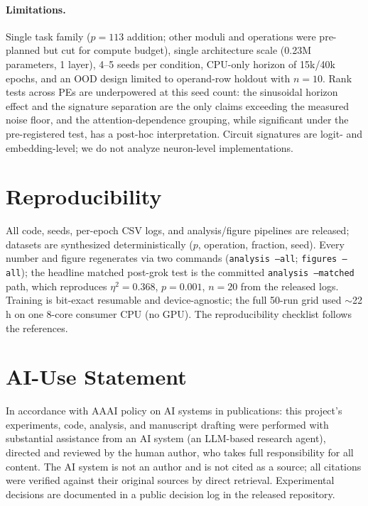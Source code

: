 \documentclass[letterpaper]{article}
\begin{document}
\paragraph{Limitations.} Single task family ($p{=}113$ addition; other moduli
and operations were pre-planned but cut for compute budget), single
architecture scale (0.23M parameters, 1 layer), 4--5 seeds per condition,
CPU-only horizon of 15k/40k epochs, and an OOD design limited to operand-row
holdout with $n{=}10$. Rank tests across PEs are underpowered at this seed
count: the sinusoidal horizon effect and the signature separation are the only
claims exceeding the measured noise floor, and the attention-dependence
grouping, while significant under the pre-registered test, has a post-hoc
interpretation. Circuit signatures are logit- and embedding-level; we do not
analyze neuron-level implementations.

\section{Reproducibility}

All code, seeds, per-epoch CSV logs, and analysis/figure pipelines are
released; datasets are synthesized deterministically ($p$, operation,
fraction, seed). Every number and figure regenerates via two commands
(\texttt{analysis --all}; \texttt{figures --all}); the headline matched
post-grok test is the committed \texttt{analysis --matched} path, which
reproduces $\eta^2{=}0.368$, $p{=}0.001$, $n{=}20$ from the released logs.
Training is bit-exact resumable and device-agnostic; the full 50-run grid
used $\sim$22 h on one 8-core consumer CPU (no GPU). The reproducibility
checklist follows the references.

\section*{AI-Use Statement}

In accordance with AAAI policy on AI systems in publications: this project's
experiments, code, analysis, and manuscript drafting were performed with
substantial assistance from an AI system (an LLM-based research agent),
directed and reviewed by the human author, who takes full responsibility for
all content. The AI system is not an author and is not cited as a source; all
citations were verified against their original sources by direct retrieval.
Experimental decisions are documented in a public decision log in the released
repository.


\end{document}
